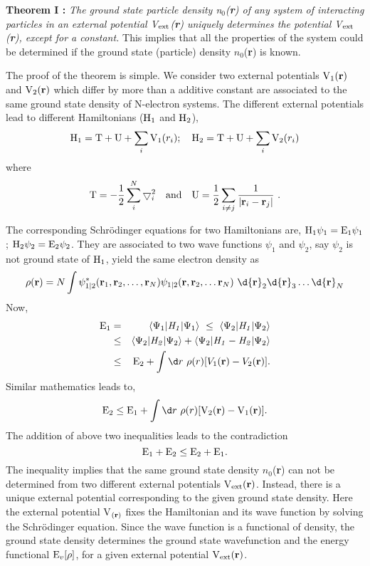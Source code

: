 {\bf Theorem I :}  {\it The ground state particle density n$_0$({\bf r}) of any system of interacting particles in an external potential V$_{\rm{ext}}$({\bf r}) uniquely determines the potential V$_{\rm{ext}}$({\bf r}), except for a constant.} This implies that all the properties of the system could be determined if the ground state (particle) density $n_0$({\bf r}) is known.

The proof of the theorem is simple. We consider two external potentials ${\rm V}_1({\bf r})$ and ${\rm V}_2({\bf r})$ which differ by more than a additive constant are associated to the same ground state density of N-electron systems. The different external potentials lead to different Hamiltonians (${\rm H}_1$ and ${\rm H}_2$), 
\[ {\rm H}_1 = {\rm T} + {\rm U} +\sum_{i}{\rm V}_1(r_i);\quad {\rm H}_2 = {\rm T} + {\rm U} + \sum_{i}{\rm V}_2(r_i) \]
where 
\[{\rm T} = -\frac{1}{2}\sum_{i}^{N}\bigtriangledown_i^2 \quad \mbox{and}\quad  {\rm U} = \frac{1}{2}\sum_{i\neq j}\frac{1}{|{\bf r}_i -{\bf r}_j|}\ .\]

The corresponding Schr\"odinger equations for two Hamiltonians are, ${\rm H_1}\psi_1 = {\rm E}_1\psi_1$; ${\rm H}_2 \psi_2 = {\rm E}_2\psi_2$. They are associated to two wave functions $\psi_1$ and $\psi_2$, say $\psi_2$ is not ground state of ${\rm H}_1 $, yield the same electron density as
\begin{equation}
\rho({\bf r}) = N\int \psi_{1|2}^*({\bf r}_1,{\bf r}_2,\dots,{\bf r}_N)\psi_{1|2}({\bf r},{\bf r}_2,\dots{\bf r}_N)\ \d{\bf r}_2\d{\bf r}_3\dots \d{\bf r}_N
\end{equation}
Now,
     \begin{eqnarray}
      {\rm E}_1&=&\langle\Psi_1|{\it H_1}|\Psi_1\rangle \ \leq \ 
       \langle\Psi_2|{\it H_1}|\Psi_2\rangle \nonumber\\  
      &\leq& \langle\Psi_2|{\it H_2}|\Psi_2\rangle + \langle\Psi_2|{\it H_1}-{\it H_2}|\Psi_2\rangle \nonumber\\  
      &\leq&  {\rm E}_2 + \int \d r~\rho(r)[V_1({\bf r}) - V_2({\bf r})].
     \end{eqnarray}
Similar mathematics leads to,
\begin{equation}
{\rm E}_2 \leq {\rm E}_1 + \int \d r~\rho(r)[{\rm V}_2({\bf r}) - {\rm V}_1({\bf r})].
\end{equation}
The addition of above two inequalities leads to the contradiction
\begin{equation}
{\rm E}_1 + {\rm E}_2 \leq {\rm E}_2 + {\rm E}_1.
\end{equation}
The inequality implies that the same ground state density $n_0$({\bf r}) can not be determined from two different external potentials V$_{\rm ext}({\bf r})$. Instead, there is a unique external potential corresponding to the given ground state density. Here the external potential V$_{({\bf r})}$ fixes the Hamiltonian and its wave function by solving the Schr\"odinger equation. Since the wave function is a functional of density, the ground state density determines the ground state wavefunction and the energy functional ${\rm E}_v[{\rho}]$, for a given external potential ${\rm V}_{\rm ext}({\bf r})$.


